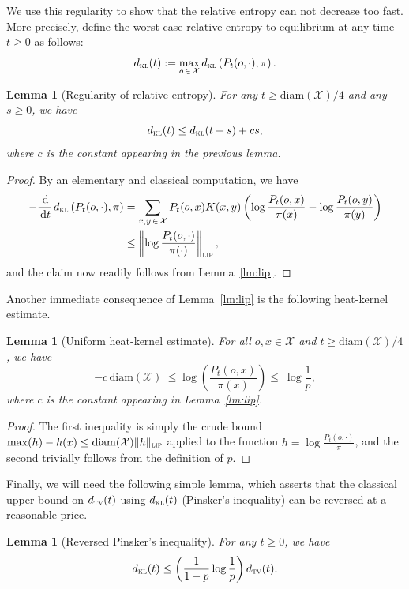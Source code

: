 \documentclass[10pt]{amsart}
\newtheorem{lemm}[theo]{Lemma}\newtheorem{prop}[theo]{Proposition}\newtheorem{coro}[theo]{Corollary}\newtheorem{conj}[theo]{Conjecture}
\theoremstyle{definition}\newtheorem{defi}[theo]{Definition}\newtheorem{rema}[theo]{Remark}\newtheorem{exam}[theo]{Example}\newtheorem{exem}[theo]{Example}\newtheorem{nota}[theo]{Notation}
\newcommand{\dd}{\,\mathrm{d}}
\newcommand{\cX}{\mathcal{X}}
\newcommand{\dtv}{d_{\textsc{tv}}}
\newcommand{\dkl}{d_{\textsc{kl}}}
\newcommand{\pim}{p}
\newcommand{\diam}{\mathrm{diam}}
\newcommand{\lip}{{\textsc{lip}}}
\begin{document}
We use this regularity to show that the relative entropy can not decrease too fast. More precisely, define the worst-case relative entropy to equilibrium at any time $t\ge 0$ as follows:
\[
\dkl(t) := \max_{o\,\in\,\cX}\dkl\left(P_t(o,\cdot),\pi\right).
\]


\begin{lemm}[Regularity of relative entropy]\label{lm:slow}
For any $t\ge \diam(\cX)/4$ and any $s\ge 0$, we have
\[
\dkl(t) \le \dkl(t+s)+c s,
\]
where $c$ is the constant appearing in the previous lemma.
\end{lemm}

\begin{proof}
By an elementary and classical computation, we have
\begin{align*}
-\frac{\dd}{\dd t}\,\dkl\left(P_t(o,\cdot),\pi\right) & = \sum_{x,y\,\in\,\cX}P_t(o,x)K(x,y)\left(\log\frac{P_t(o,x)}{\pi(x)}-\log\frac{P_t(o,y)}{\pi(y)}\right)\\
& \le \left\|\log \frac{P_t(o,\cdot)}{\pi(\cdot)}\right\|_{\textsc{lip}},
\end{align*}
and the claim now readily follows from Lemma~\ref{lm:lip}.
\end{proof}

Another immediate consequence of Lemma~\ref{lm:lip} is the following heat-kernel estimate.

\begin{lemm}[Uniform heat-kernel estimate]\label{lm:uniform}
For all $o,x\in\cX$ and $t\ge \diam(\cX)/4$, we have
\[
-c\,\diam(\cX) \ \le \log\left(\frac{P_t(o,x)}{\pi(x)}\right) \le \ \log\frac{1}{p},
\]
where $c$ is the constant appearing in Lemma~\ref{lm:lip}.
\end{lemm}


\begin{proof}
The first inequality is simply the crude bound $\max(h)-h(x)\le
\diam(\cX)\linebreak\|h\|_\lip$ applied to the function $h=\log
\frac{P_t(o,\cdot)}{\pi}$, and the second trivially follows from the definition of $p$.
\end{proof}

Finally, we will need the following simple lemma, which asserts that the classical upper bound on $\dtv(t)$ using $\dkl(t)$ (Pinsker's inequality) can be reversed at a reasonable price.

\begin{lemm}[Reversed Pinsker's inequality]\label{lm:pinsker}
For any $t\ge 0$, we have
\[
\dkl(t) \le \left(\frac{1}{1-\pim}\log\frac 1{\pim}\right)\dtv(t).
\]
\end{lemm}
\end{document}
